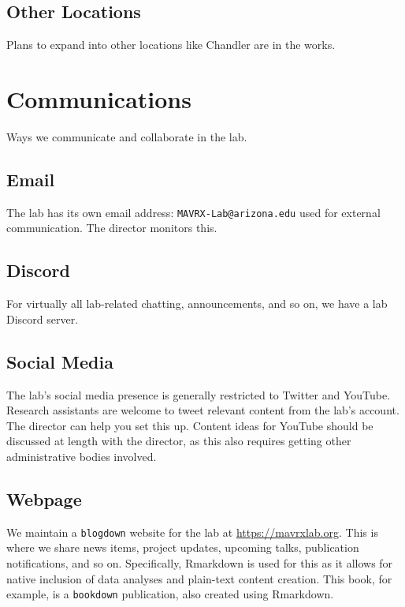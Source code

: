 \documentclass[]{tufte-book}
\begin{document}
\hypertarget{other-locations}{%
\section{Other Locations}\label{other-locations}}

Plans to expand into other locations like Chandler are in the works.

\hypertarget{comms}{%
\chapter{Communications}\label{comms}}

Ways we communicate and collaborate in the lab.

\hypertarget{email}{%
\section{Email}\label{email}}

The lab has its own email address: \texttt{MAVRX-Lab@arizona.edu} used for external communication. The director monitors this.

\hypertarget{discord}{%
\section{Discord}\label{discord}}

For virtually all lab-related chatting, announcements, and so on, we have a lab Discord server.

\hypertarget{social}{%
\section{Social Media}\label{social}}

The lab's social media presence is generally restricted to Twitter and YouTube. Research assistants are welcome to tweet relevant content from the lab's account. The director can help you set this up. Content ideas for YouTube should be discussed at length with the director, as this also requires getting other administrative bodies involved.

\hypertarget{webpage}{%
\section{Webpage}\label{webpage}}

We maintain a \texttt{blogdown} website for the lab at \url{https://mavrxlab.org}. This is where we share news items, project updates, upcoming talks, publication notifications, and so on. Specifically, Rmarkdown is used for this as it allows for native inclusion of data analyses and plain-text content creation. This book, for example, is a \texttt{bookdown} publication, also created using Rmarkdown.
\end{document}
